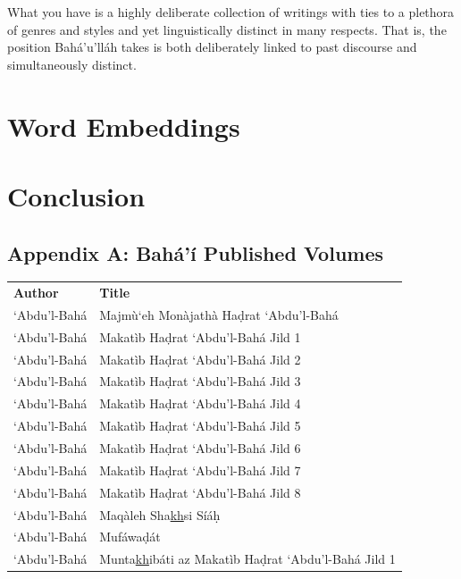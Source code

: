 \documentclass[12pt, oneside]{report}
\begin{document}
What you have is a highly deliberate collection of writings with ties to a plethora of genres and styles and yet linguistically distinct in many respects. That is, the position Bahá’u’lláh takes is both deliberately linked to past discourse and simultaneously	distinct.


\chapter{Word Embeddings}

\chapter{Conclusion}
\newpage
\begin{appendix}
\chapter*{Appendix A: Bah\'{a}'\'{i} Published Volumes}
\label{app-1}
\begin{table}[ht]
	\setlength{\tabcolsep}{18pt}
	\begin{tabular}{ll}
	\textbf{Author} & \textbf{Title} \\
		`Abdu'l-Bah\'{a}	& Majm\`{u}`eh Mon\`{a}jath\`{a} Ha\d{d}rat `Abdu'l-Bah\'{a} \\
	`Abdu'l-Bah\'{a}	& Makat\`{i}b Ha\d{d}rat `Abdu'l-Bah\'{a} Jild 1 \\
	`Abdu'l-Bah\'{a}	& Makat\`{i}b Ha\d{d}rat `Abdu'l-Bah\'{a} Jild 2 \\
	`Abdu'l-Bah\'{a}	& Makat\`{i}b Ha\d{d}rat `Abdu'l-Bah\'{a} Jild 3 \\
	`Abdu'l-Bah\'{a}	& Makat\`{i}b Ha\d{d}rat `Abdu'l-Bah\'{a} Jild 4 \\
	`Abdu'l-Bah\'{a}	& Makat\`{i}b Ha\d{d}rat `Abdu'l-Bah\'{a} Jild 5 \\
	`Abdu'l-Bah\'{a}	& Makat\`{i}b Ha\d{d}rat `Abdu'l-Bah\'{a} Jild 6 \\
	`Abdu'l-Bah\'{a}	& Makat\`{i}b Ha\d{d}rat `Abdu'l-Bah\'{a} Jild 7 \\
	`Abdu'l-Bah\'{a}	& Makat\`{i}b Ha\d{d}rat `Abdu'l-Bah\'{a} Jild 8 \\
	`Abdu'l-Bah\'{a}	&  Maq\`{a}leh Sha\underline{kh}si S\'{i}\'{a}\d{h} \\
	`Abdu'l-Bah\'{a}	&  Muf\'{a}wa\d{d}\'{a}t \\
	`Abdu'l-Bah\'{a}	& Munta\underline{kh}ib\'{a}ti az Makat\`{i}b Ha\d{d}rat `Abdu'l-Bah\'{a} Jild 1 \\

\end{tabular}
\end{table}
\end{appendix}
\end{document}
